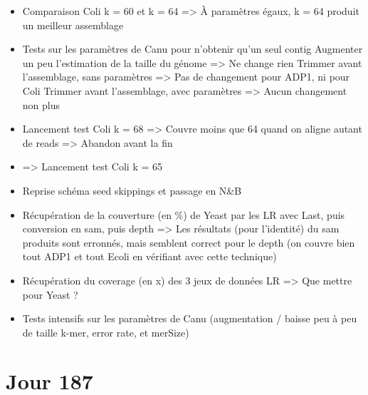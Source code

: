 \documentclass[12pt]{report}
\begin{document}
\begin{itemize}
	\item Comparaison Coli k = 60 et k = 64 => À paramètres égaux, k = 64 produit un meilleur assemblage
	
	\item Tests sur les paramètres de Canu pour n'obtenir qu'un seul contig
			Augmenter un peu l'estimation de la taille du génome => Ne change rien
			Trimmer avant l'assemblage, sans paramètres => Pas de changement pour ADP1, ni pour Coli
			Trimmer avant l'assemblage, avec paramètres => Aucun changement non plus

	\item Lancement test Coli k = 68 => Couvre moins que 64 quand on aligne autant de reads => Abandon avant la fin
	
	\item => Lancement test Coli k = 65 
	
	\item Reprise schéma seed skippings et passage en N&B
	
	\item Récupération de la couverture (en \%) de Yeast par les LR avec Last, puis conversion en sam, puis depth
		  => Les résultats (pour l'identité) du sam produits sont erronnés, mais semblent correct pour le depth
		  (on couvre bien tout ADP1 et tout Ecoli en vérifiant avec cette technique)
		  
	\item Récupération du coverage (en x) des 3 jeux de données LR => Que mettre pour Yeast ?
	
	\item Tests intensifs sur les paramètres de Canu (augmentation / baisse peu à peu de taille k-mer, error rate, et merSize)
\end{itemize}

\section{Jour 187} 
\end{document}
